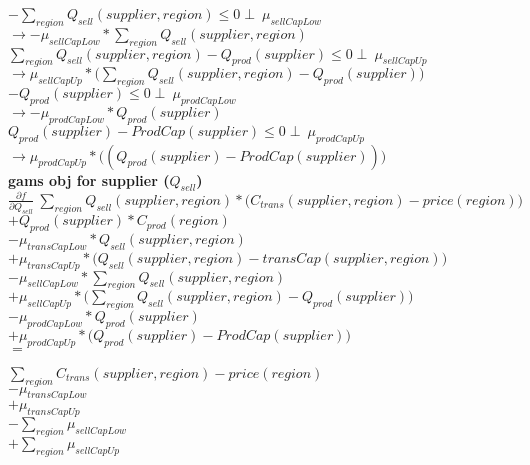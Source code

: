 \documentclass{article}
\begin{document}
	\( - \sum_{region} Q_{sell}(supplier, region)  \leq 0  \perp\: \mu_{sellCapLow}\)\\
	$\rightarrow -\mu_{sellCapLow} * \sum_{region} Q_{sell}(supplier, region)$\\
	\(\sum_{region} Q_{sell}(supplier, region) -  Q_{prod}(supplier)\leq 0  \perp\: \mu_{sellCapUp}\)\\
	$\rightarrow	 \mu_{sellCapUp}*\Big(\sum_{region} Q_{sell}(supplier, region) -  Q_{prod}(supplier) \Big)$\\

	\( - Q_{prod}(supplier) \leq 0 \perp\: \mu_{prodCapLow}\)\\
	$\rightarrow	- \mu_{prodCapLow} * Q_{prod}(supplier)$\\
	\(Q_{prod}(supplier) - ProdCap(supplier) \leq 0 \perp\: \mu_{prodCapUp}\)\\
	$\rightarrow \mu_{prodCapUp}*\Big((Q_{prod}(supplier) - ProdCap(supplier))\Big)	$\\


	



\textbf{gams obj for supplier ($Q_{sell}$)}\\
$\frac{\partial f}{\partial Q_{sell}} \:\sum_{region} Q_{sell}(supplier, region) *\Big(C_{trans}(supplier,region) - price(region)\Big)$\\
$+ Q_{prod}(supplier)*C_{prod}(region)$\\
$-\mu_{transCapLow} * Q_{sell}(supplier, region)$\\
$+\mu_{transCapUp} *\Big( Q_{sell}(supplier, region) - transCap(supplier, region)\Big)$\\
$-\mu_{sellCapLow} * \sum_{region} Q_{sell}(supplier, region)$\\
$+\mu_{sellCapUp}*\Big(\sum_{region} Q_{sell}(supplier, region) -  Q_{prod}(supplier) \Big) $\\
$-\mu_{prodCapLow} * Q_{prod}(supplier)$\\
$+\mu_{prodCapUp}*\Big(Q_{prod}(supplier) - ProdCap(supplier)\Big)$\\

$=$

$\sum_{region} C_{trans}(supplier,region) - price(region)$\\
$-\mu_{transCapLow}$\\
$+\mu_{transCapUp} $\\
$-\sum_{region}\mu_{sellCapLow} $\\
$+\sum_{region}\mu_{sellCapUp} $\\
\end{document}
